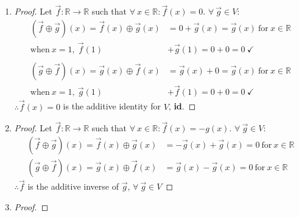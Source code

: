 \documentclass{article}
\newcommand{\bld}{\textbf}
\newcommand{\bb}{\mathbb}
\newcommand{\bitem}[1]{\item[\bld{#1.}]}
\begin{document}
\begin{enumerate}
\begin{proof}
\begin{align*}
                                                           & = \vec{f}(x) + (\vec{g}(x) + \vec{h}(x))       \\
      \text{when}~x=1,~\vec{f}(1) + (\vec{g}(1) + \vec{h}) & = 0 + (0 + 0) = 0~\checkmark                   \\ \\
      RHS = ((\vec{f} \oplus \vec{g}) \oplus \vec{h})(x)   & = (\vec{f} \oplus \vec{g})(x) + \vec{h}(x)     \\
                                                           & = (\vec{f}(x) + \vec{g}(x)) + \vec{h}(x) = LHS \\
      \text{when}~x=1,~(\vec{f}(1) + \vec{g}(1)) + \vec{h} & = (0 + 0) + 0 = 0~\checkmark
    \end{align*}
    $\therefore \forall~\vec{f},\vec{g},\vec{h} \in V: (\vec{f} \oplus (\vec{g} \oplus \vec{h}))(x) = ((\vec{f} \oplus \vec{g}) \oplus \vec{h})(x)$
  \end{proof}
  \bitem{Axiom 4}
  \begin{proof}
    Let $\vec{f}: \bb{R} \rightarrow \bb{R}$ such that $\forall~x \in \bb{R}: \vec{f}(x) = 0$. $\forall~\vec{g} \in V$:
    \begin{align*}
      (\vec{f} \oplus \vec{g})(x) = \vec{f}(x) \oplus \vec{g}(x) & = 0 + \vec{g}(x)= \vec{g}(x)~\text{for}~x \in \bb{R} \\
      \text{when}~x=1,~\vec{f}(1)                                & + \vec{g}(1) = 0 + 0 = 0~\checkmark                  \\ \\
      (\vec{g} \oplus \vec{f})(x) = \vec{g}(x) \oplus \vec{f}(x) & = \vec{g}(x) + 0= \vec{g}(x)~\text{for}~x \in \bb{R} \\
      \text{when}~x=1,~\vec{g}(1)                                & + \vec{f}(1) = 0 + 0 = 0~\checkmark
    \end{align*}
    $\therefore \vec{f}(x) = 0$ is the additive identity for $V$, \bld{id}.
  \end{proof}
  \bitem{Axiom 5}
  \begin{proof}
    Let $\vec{f}: \bb{R} \rightarrow \bb{R}$ such that $\forall~x \in \bb{R}: \vec{f}(x) = -g(x)$. $\forall~\vec{g} \in V$:
    \begin{align*}
      (\vec{f} \oplus \vec{g})(x) = \vec{f}(x) \oplus \vec{g}(x) & = -\vec{g}(x) + \vec{g}(x)= 0~\text{for}~x \in \bb{R} \\
      (\vec{g} \oplus \vec{f})(x) = \vec{g}(x) \oplus \vec{f}(x) & = \vec{g}(x) - \vec{g}(x)= 0~\text{for}~x \in \bb{R}
    \end{align*}
    $\therefore \vec{f}$ is the additive inverse of $\vec{g}$, $\forall~\vec{g} \in V$
  \end{proof}
  \bitem{Axiom 6}
  \begin{proof}
    
  \end{proof}
\end{enumerate}
\end{document}

